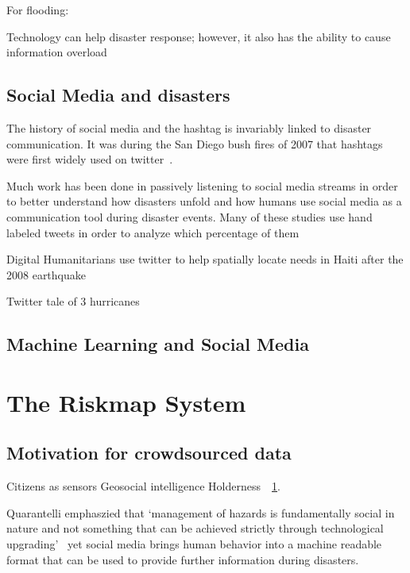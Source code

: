 For flooding:~\cite{ahernGlobalHealthImpacts2005}

Technology can help disaster response; however, it also has the ability to cause
information overload\cite{tierneyFacingUnexpectedDisaster2001}


\subsection{Social Media and disasters} The history of social media and the
hashtag is invariably linked to disaster communication.  It was during the San
Diego bush fires of 2007 that hashtags were first widely used on
twitter~\cite{salazarHashtagsAnnotatedHistory2017}.


Much work has been done in passively listening to social media streams in order
to better understand how disasters unfold and how humans use social media as a
communication tool during disaster events. Many of these studies use hand
labeled tweets in order to analyze which percentage of them 

Digital Humanitarians use twitter to help spatially locate needs in Haiti after
the 2008 earthquake~\cite{meierDigitalHumanitariansHow2015}

Twitter tale of 3 hurricanes~\cite{alamTwitterTaleThree2018}

\subsection{Machine Learning and Social Media} 



\section{The Riskmap System}\label{ch1:riskmap}


\subsection{Motivation for crowdsourced data} Citizens as sensors Geosocial
intelligence
Holderness~\cite{holdernessSocialMediaGeoSocial2015a}~\ref{ch1:riskmap}.

Quarantelli emphaszied that  `management of hazards is fundamentally social in
nature and not something that can be achieved strictly through technological
upgrading'~\cite{tierneyFacingUnexpectedDisaster2001} yet social media brings
human behavior into a machine readable format that can be used to provide
further information during disasters.


\subsection{}

